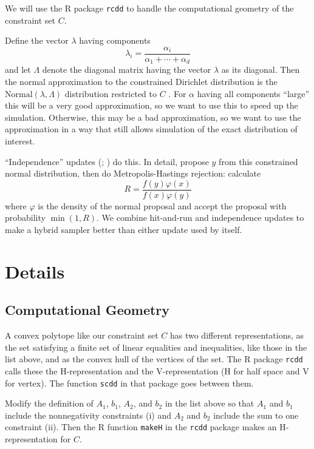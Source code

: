 \documentclass[11pt]{article}
\begin{document}
We will use the R package \texttt{rcdd} \citep*{rcdd} to handle
the computational geometry of the constraint set $C$.

Define the vector $\lambda$ having components
\begin{equation} \label{eq:lambda}
   \lambda_i = \frac{\alpha_i}{\alpha_1 + \cdots + \alpha_d}
\end{equation}
and let $\Lambda$ denote the diagonal matrix having the vector $\lambda$
as its diagonal.  Then the normal approximation to the constrained
Dirichlet distribution is
the $\text{Normal}(\lambda, \Lambda)$ distribution
restricted to $C$ \citep[Theorem~4.2]{geyer-meeden}.  For $\alpha$ having
all components ``large'' this will be a very good approximation, so we want
to use this to speed up the simulation.  Otherwise, this may be a bad
approximation, so we want to use the approximation in a way that still
allows simulation of the exact distribution of interest.

``Independence'' updates (\citealp{hastings};
\citealp[Section~2.3.3]{tierney}) do this.
In detail, propose $y$ from this constrained normal distribution,
then do Metropolis-Hastings rejection: calculate
$$
    R = \frac{f(y) \varphi(x)}{f(x) \varphi(y)}
$$
where $\varphi$ is the density of the normal proposal and accept the
proposal with probability $\min(1, R)$.
We combine hit-and-run and independence updates to make a hybrid sampler
\citep[Section~2.4]{tierney} better than either update used by itself.

\section{Details}

\subsection{Computational Geometry}

A convex polytope like our constraint set $C$ has two different
representations, as the set satisfying a finite set of linear equalities
and inequalities, like those in the list above, and as the convex hull
of the vertices of the set.   The R package \texttt{rcdd} calls these
the H-representation and the V-representation
(H for half space and V for vertex).  The function
\texttt{scdd} in that package goes between them.

Modify the definition of $A_1$, $b_1$, $A_2$, and $b_2$ in the list above
so that $A_1$ and $b_1$ include the nonnegativity constraints (i) and
$A_2$ and $b_2$ include the sum to one constraint (ii).  Then the
R function \texttt{makeH} in the \texttt{rcdd} package makes
an H-representation for $C$.
\end{document}
